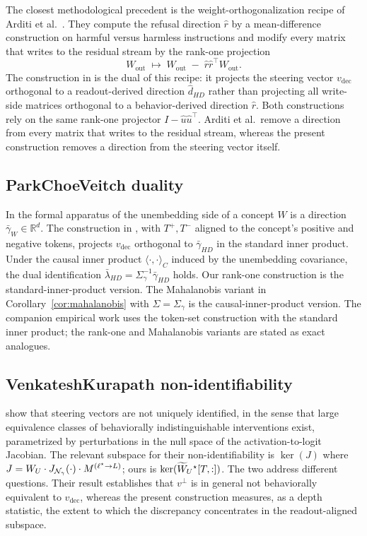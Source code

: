 \documentclass[11pt,letterpaper]{article}
\theoremstyle{plain}
\theoremstyle{definition}
\newcommand{\R}{\mathbb{R}}
\newcommand{\1}{\mathbf{1}}
\newcommand{\WU}{W_{U}\mathchoice{}{}{}{}}
\newcommand{\WUt}{\widetilde{W}_{U}\mathchoice{}{}{}{}}
\newcommand{\vdec}{v_{\text{dec}}}
\newcommand{\vperp}{v^{\perp}}
\begin{document}
The closest methodological precedent is the weight-orthogonalization recipe of Arditi et al.\ \cite{arditi2024refusal}. They compute the refusal direction $\hat{r}$ by a mean-difference construction on harmful versus harmless instructions and modify every matrix that writes to the residual stream by the rank-one projection
\begin{equation}
W_{\text{out}} \;\mapsto\; W_{\text{out}} \;-\; \hat{r}\hat{r}^\top W_{\text{out}}.
\label{eq:arditi}
\end{equation}
The construction in  is the dual of this recipe: it projects the steering vector $\vdec$ orthogonal to a readout-derived direction $\hat{d}_{HD}$ rather than projecting all write-side matrices orthogonal to a behavior-derived direction $\hat{r}$. Both constructions rely on the same rank-one projector $I - \hat{u}\hat{u}^\top$. Arditi et al.\ remove a direction from every matrix that writes to the residual stream, whereas the present construction removes a direction from the steering vector itself.

\subsection{Park\textendash Choe\textendash Veitch duality}

In the formal apparatus of \cite{park2024linear} the unembedding side of a concept $W$ is a direction $\bar{\gamma}_W \in \R^d$. The construction in , with $T^+, T^-$ aligned to the concept's positive and negative tokens, projects $\vdec$ orthogonal to $\bar{\gamma}_{HD}$ in the standard inner product. Under the causal inner product $\langle \cdot, \cdot\rangle_C$ induced by the unembedding covariance, the dual identification $\bar{\lambda}_{HD} = \Sigma_\gamma^{-1} \bar{\gamma}_{HD}$ holds. Our rank-one construction is the standard-inner-product version. The Mahalanobis variant in Corollary~\ref{cor:mahalanobis} with $\Sigma = \Sigma_\gamma$ is the causal-inner-product version. The companion empirical work uses the token-set construction with the standard inner product; the rank-one and Mahalanobis variants are stated as exact analogues.

\subsection{Venkatesh\textendash Kurapath non-identifiability}

\cite{venkatesh2026nonid} show that steering vectors are not uniquely identified, in the sense that large equivalence classes of behaviorally indistinguishable interventions exist, parametrized by perturbations in the null space of the activation-to-logit Jacobian. The relevant subspace for their non-identifiability is $\ker(J)$ where $J = \WU \cdot J_{\mathcal{N}_\gamma}(\cdot) \cdot M^{(\ell^\star \to L)}$; ours is $\ker(\WUt^\star[T,:])$. The two address different questions. Their result establishes that $\vperp$ is in general not behaviorally equivalent to $\vdec$, whereas the present construction measures, as a depth statistic, the extent to which the discrepancy concentrates in the readout-aligned subspace.
\end{document}
